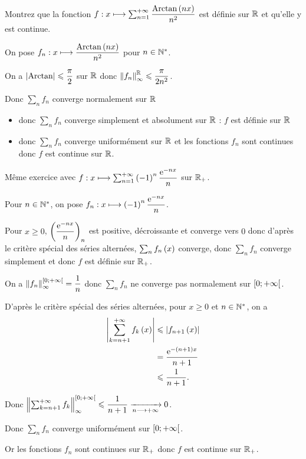 \begin{exo}
Montrez que la fonction \(f:x\longmapsto\sum_{n=1}^{+\infty}\dfrac{\operatorname{Arctan}\left(nx\right)}{n^2}\) est définie sur \(\mathbb{R}\) et qu'elle y est continue.
\end{exo}

\begin{corr}
On pose \(f_n:x\longmapsto\dfrac{\operatorname{Arctan}\left(nx\right)}{n^2}\) pour \(n\in\mathbb{N}^*\).

On a \(\left\lvert\operatorname{Arctan}\right\rvert\leqslant\dfrac{\pi}{2}\) sur \(\mathbb{R}\) donc \(\norme{f_n}_\infty^\R\leq\dfrac{\pi}{2n^2}\).

Donc \(\sum_nf_n\) converge normalement sur \(\mathbb{R}\) \begin{itemize}
    \item donc \(\sum_nf_n\) converge simplement et absolument sur \(\mathbb{R}\) : \(f\) est définie sur \(\mathbb{R}\) \\
    \item donc \(\sum_nf_n\) converge uniformément sur \(\mathbb{R}\) et les fonctions \(f_n\) sont continues donc \(f\) est continue sur \(\mathbb{R}\).
\end{itemize}
\end{corr}

\begin{exo}
Même exercice avec \(f:x\longmapsto\sum_{n=1}^{+\infty}\left(-1\right)^n\dfrac{\mathrm{e}^{-nx}}{n}\) sur \(\mathbb{R}_+\).
\end{exo}

\begin{corr}
Pour \(n\in\mathbb{N}^*\), on pose \(f_n:x\longmapsto\left(-1\right)^n\dfrac{\mathrm{e}^{-nx}}{n}\).

Pour \(x\geq0\), \(\left(\dfrac{\mathrm{e}^{-nx}}{n}\right)_n\) est positive, décroissante et converge vers \(0\) donc d'après le critère spécial des séries alternées, \(\sum_nf_n\left(x\right)\) converge, donc \(\sum_nf_n\) converge simplement et donc \(f\) est définie sur \(\mathbb{R}_+\).

On a \(\norme{f_n}_\infty^{\intervie{0}{\pinf}}=\dfrac{1}{n}\) donc \(\sum_nf_n\) ne converge pas normalement sur \(\left[0;+\infty\right[\).

D'après le critère spécial des séries alternées, pour \(x\geq0\) et \(n\in\mathbb{N}^*\), on a \[\begin{aligned}
\left\lvert\sum_{k=n+1}^{+\infty}f_k\left(x\right)\right\rvert&\leqslant\left\lvert f_{n+1}\left(x\right)\right\rvert \\
&=\dfrac{\mathrm{e}^{-\left(n+1\right)x}}{n+1} \\
&\leqslant\dfrac{1}{n+1}.
\end{aligned}\]

Donc \(\norme{\sum_{k=n+1}^{\pinf}f_k}_\infty^{\intervie{0}{\pinf}}\leq\dfrac{1}{n+1}\tendqd{n\to\pinf}0\).

Donc \(\sum_nf_n\) converge uniformément sur \(\left[0;+\infty\right[\).

Or les fonctions \(f_n\) sont continues sur \(\mathbb{R}_+\) donc \(f\) est continue sur \(\mathbb{R}_+\).
\end{corr}

